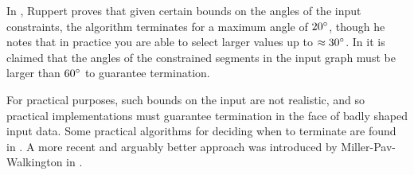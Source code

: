\documentclass[10pt,a4paper]{article}
\begin{document}
In \cite{ruppert}, Ruppert proves that given certain bounds on the angles of the input constraints, the algorithm terminates for a maximum angle of $20 \degree$, though he notes that in practice you are able to select larger values up to $\approx 30 \degree$. In \cite{shewchuk} it is claimed that the angles of the constrained segments in the input graph must be larger than $60 \degree$ to guarantee termination.

For practical purposes, such bounds on the input are not realistic, and so practical implementations must guarantee termination in the face of badly shaped input data. Some practical algorithms for deciding when to terminate are found in \cite{5}. A more recent and arguably better approach was introduced by Miller-Pav-Walkington in \cite{miller}.
\end{document}
